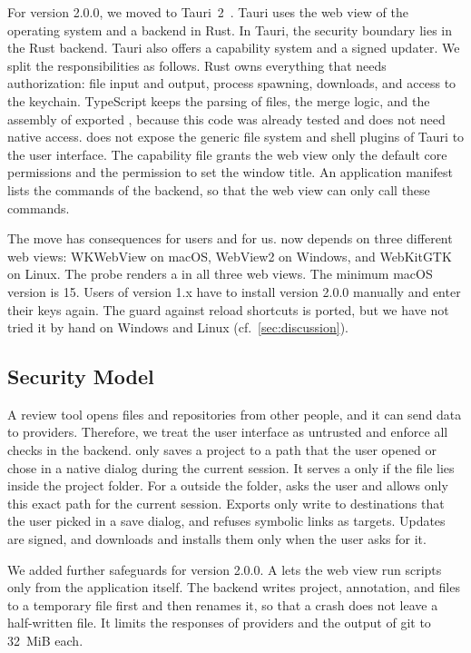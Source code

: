 For version 2.0.0, we moved \SaiLoR to Tauri~2~\cite{tauri2}.
Tauri uses the web view of the operating system and a backend in Rust.
In Tauri, the security boundary lies in the Rust backend. Tauri also offers a capability system and a signed updater.
We split the responsibilities as follows.
Rust owns everything that needs authorization: file input and output, process spawning, downloads, and access to the keychain.
TypeScript keeps the parsing of files, the merge logic, and the assembly of exported \PDFs, because this code was already tested and does not need native access.
\SaiLoR does not expose the generic file system and shell plugins of Tauri to the user interface.
The capability file grants the web view only the default core permissions and the permission to set the window title.
An application manifest lists the commands of the backend, so that the web view can only call these commands.

The move has consequences for users and for us.
\SaiLoR now depends on three different web views: WKWebView on macOS, WebView2 on Windows, and WebKitGTK on Linux.
The \CI probe renders a \PDF in all three web views.
The minimum macOS version is 15.
Users of version 1.x have to install version 2.0.0 manually and enter their \API keys again.
The guard against reload shortcuts is ported, but we have not tried it by hand on Windows and Linux (cf.~\autoref{sec:discussion}).

\subsection{Security Model}\label{sec:architecture-security}

A review tool opens files and repositories from other people, and it can send data to \LLM providers.
Therefore, we treat the user interface as untrusted and enforce all checks in the backend.
\SaiLoR only saves a project to a path that the user opened or chose in a native dialog during the current session.
It serves a \PDF only if the file lies inside the project folder.
For a \PDF outside the folder, \SaiLoR asks the user and allows only this exact path for the current session.
Exports only write to destinations that the user picked in a save dialog, and \SaiLoR refuses symbolic links as targets.
Updates are signed, and \SaiLoR downloads and installs them only when the user asks for it.

We added further safeguards for version 2.0.0.
A \CSP lets the web view run scripts only from the application itself.
The backend writes project, annotation, and \PDF files to a temporary file first and then renames it, so that a crash does not leave a half-written file.
It limits the responses of \LLM providers and the output of git to 32~MiB each.

